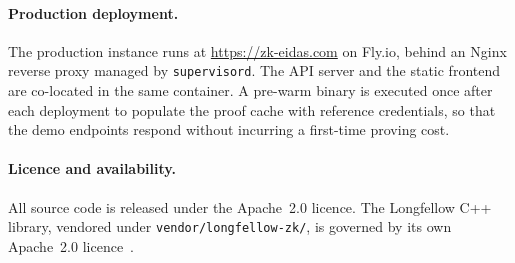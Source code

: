 \paragraph{Production deployment.}
The production instance runs at \url{https://zk-eidas.com} on Fly.io, behind an Nginx
reverse proxy managed by \texttt{supervisord}.
The API server and the static frontend are co-located in the same container.
A pre-warm binary is executed once after each deployment to populate the proof cache with
reference credentials, so that the demo endpoints respond without incurring a first-time
proving cost.

\paragraph{Licence and availability.}
All source code is released under the Apache~2.0 licence.
The Longfellow C++ library, vendored under \texttt{vendor/longfellow-zk/}, is governed by its
own Apache~2.0 licence~\cite{longfellow}.
